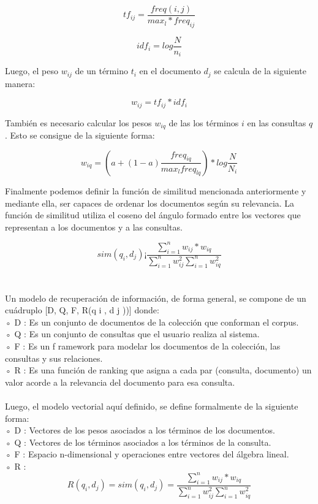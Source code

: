 \documentclass[runningheads,a4paper]{llncs}
\begin{document}
$$
tf_{ij} = \frac{freq(i,j)}{max_l * freq_{ij}}
$$

$$
idf_i = log \frac{N}{n_i}
$$

Luego, el peso $w_{ij}$ de un término $t_i$ en el documento $d_j$ se calcula de la siguiente manera:

$$
w_{ij} = tf_{ij} * idf_i
$$


También es necesario calcular los pesos $w_{iq}$ de las los términos $i$ en las consultas $q$. Esto se consigue de la siguiente forma:

$$
w_{iq} = (a + (1 - a)\frac{freq_{iq}}{max_l freq_{lq}}) * log\frac{N}{N_i}
$$

Finalmente podemos definir la función de similitud mencionada anteriormente y mediante ella, ser capaces de ordenar los documentos según su relevancia. La función de similitud utiliza el coseno del ángulo formado entre los vectores que representan a los documentos y a las consultas.

$$
sim(q_i, d_j) ¡ \frac{\sum_{i = 1}^{n}w_{ij} * w_{iq}}{\sum_{i = 1}^{n}w^2_{ij} \sum_{i = 1}^{n}w^2_{iq} }
$$\\\\


Un modelo de recuperación de información, de forma general, se compone de un cuádruplo [D, Q, F, R(q i , d j ))] donde:\\
◦ D : Es un conjunto de documentos de la colección que conforman el corpus.\\
◦ Q : Es un conjunto de consultas que el usuario realiza al sistema.\\
◦ F : Es un f ramework para modelar los documentos de la colección, las consultas
y sus relaciones.\\
◦ R : Es una función de ranking que asigna a cada par (consulta, documento) un
valor acorde a la relevancia del documento para esa consulta.\\\\

Luego, el modelo vectorial aquí definido, se define formalmente de la siguiente forma:\\
◦ D : Vectores de los pesos asociados a los términos de los documentos.\\
◦ Q : Vectores de los términos asociados a los términos de la consulta.\\
◦ F : Espacio n-dimensional y operaciones entre vectores del álgebra lineal.\\
◦ R : $$ R(q_i, d_j) =
sim(q_i, d_j) = \frac{\sum_{i = 1}^{n}w_{ij} * w_{iq}}{\sum_{i = 1}^{n}w^2_{ij} \sum_{i = 1}^{n}w^2_{iq} }
$$
\end{document}
